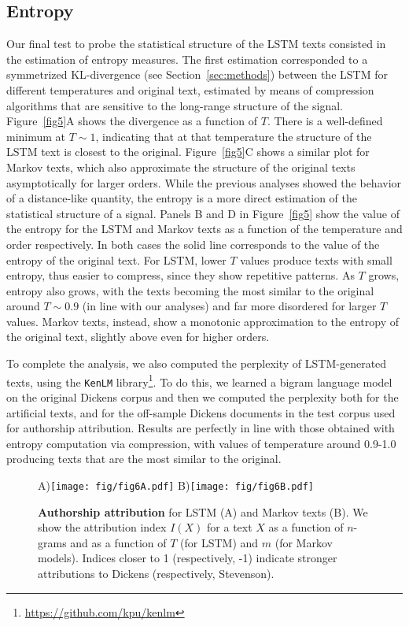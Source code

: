 \documentclass[journal]{IEEEtran}
\begin{document}
\subsection{Entropy}
Our final test to probe the statistical structure of the LSTM texts consisted in
the estimation of entropy measures. The first estimation
corresponded to a symmetrized KL-divergence (see Section~\ref{sec:methods})
between the LSTM for different temperatures and original text, estimated by
means of compression algorithms that are sensitive
to the long-range structure of the signal. Figure~\ref{fig5}A shows the
divergence as a function of $T$. There is a
 well-defined minimum at $T\sim1$, indicating that at that temperature the
structure of the LSTM text is closest to the original.
Figure~\ref{fig5}C shows
 a similar plot for Markov texts, which also
approximate the structure of the original texts asymptotically for larger
orders.
While the previous analyses showed the behavior of a distance-like quantity,
the entropy is a more direct estimation of the statistical structure of a
signal. Panels B and D in Figure~\ref{fig5} show the value of the entropy for
the
LSTM and Markov texts as a function of the temperature and order respectively.
In both cases the solid line corresponds to the value of the entropy of the
original text. For LSTM, lower $T$ values produce texts with small
entropy, thus easier to compress, since they show repetitive patterns. As $T$ grows, entropy also grows, with the texts becoming the most
similar to the original around $T\sim0.9$ (in line with our analyses) and
far more disordered for larger $T$ values.
Markov texts, instead, show a monotonic approximation to the entropy of the
original text, slightly above even for higher orders.

To complete the analysis, we also computed the perplexity of LSTM-generated texts, using the \texttt{KenLM}
library\footnote{\url{https://github.com/kpu/kenlm}}. To do this, we learned a
bigram language model on the original Dickens corpus and then we computed the
perplexity both for the artificial texts,
and for the off-sample Dickens documents in the test corpus used for authorship
attribution. Results are perfectly in line with those obtained with
entropy computation via compression, with values of temperature around 0.9-1.0
producing texts that are the most similar to the original.


\begin{figure*}[!t]
\begin{center}
A)\texttt{[image: fig/fig6A.pdf]}
B)\texttt{[image: fig/fig6B.pdf]}\\
 \caption{\textbf{Authorship attribution} for LSTM (A)
 and Markov texts (B). We show the attribution index
$I(X)$ for a text $X$ as a function of $n$-grams and as a function of $T$ (for LSTM) and $m$ (for Markov models). Indices closer to 1 (respectively,
-1) indicate stronger attributions to Dickens (respectively, Stevenson).\label{fig:aa}}
\end{center}
\end{figure*}
\end{document}

